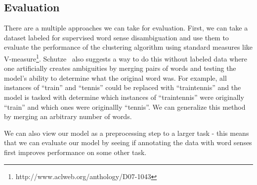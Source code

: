 \documentclass[11pt,letterpaper]{article}
\begin{document}
\subsection{Evaluation}
There are a multiple approaches we can take for evaluation. First, we can take a dataset labeled for supervised word sense disambiguation and use them to evaluate the performance of the clustering algorithm using standard measures like V-measure\footnote{http://www.aclweb.org/anthology/D07-1043}. Schutze~ also suggests a way to do this without labeled data where one artificially creates ambiguities by merging pairs of words and testing the model's ability to determine what the original word was. For example, all instances of ``train'' and ``tennis'' could be replaced with ``traintennis'' and the model is tasked with determine which instances of ``traintennis'' were originally ``train'' and which ones were originallly ``tennis''. We can generalize this method by merging an arbitrary number of words. 

We can also view our model as a preprocessing step to a larger task - this means that we can evaluate our model by seeing if annotating the data with word senses first improves performance on some other task.  



\end{document}
